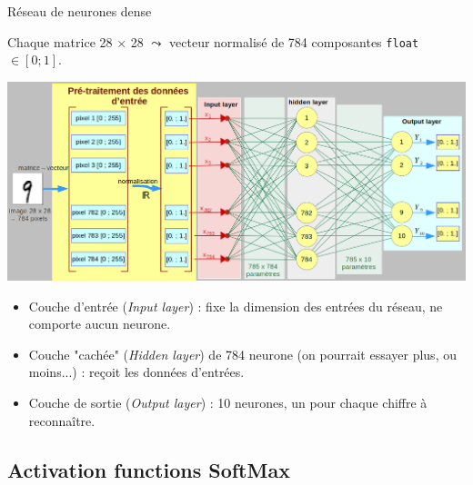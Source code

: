 \documentclass[10pt,serif,mathserif,compress,hyperref={colorlinks}]{beamer}
\begin{document}
\begin{frame}{Réseau de neurones dense}

  {\footnotesize Chaque matrice 28$\,\times\,$28 $\leadsto$ vecteur normalisé de 784 composantes \texttt{float} $\in [0;1]$.}

  \hspace*{-5mm}\includegraphics[width=.9\textwidth]{images/archiReseau-2.png}
  
  {\footnotesize
  \begin{itemize}
  \item Couche d'entrée ({\em Input layer}) : fixe la dimension des entrées du réseau, ne comporte aucun neurone.
  \item Couche "cachée" ({\em Hidden layer}) de 784 neurone (on pourrait essayer plus, ou moins...) : reçoit les données d'entrées.
  \item Couche de sortie ({\em Output layer}) : 10 neurones, un pour chaque chiffre à reconnaître.
  \end{itemize}
  }

  
\end{frame}

\subsection{Activation functions SoftMax}
\end{document}
